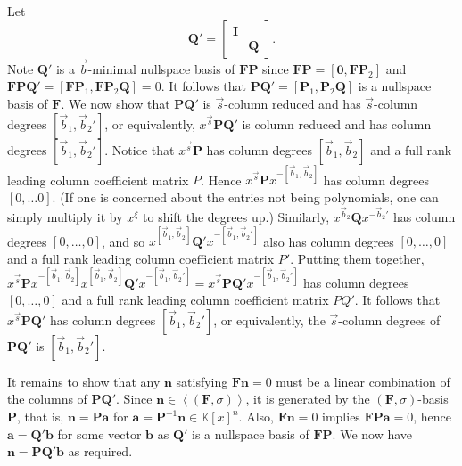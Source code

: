 \begin{pf}
Let 
\[
\mathbf{Q}'=\begin{bmatrix}\mathbf{I}\\
 & \mathbf{Q}
\end{bmatrix}.
\]
 Note $\mathbf{Q}'$ is a $\vec{b}$-minimal nullspace basis of $\mathbf{F}\mathbf{P}$
since $\mathbf{F}\mathbf{P}=\left[\mathbf{0},\mathbf{F}\mathbf{P}_{2}\right]$
and $\mathbf{F}\mathbf{P}\mathbf{Q}'=\left[\mathbf{F}\mathbf{P}_{1},\mathbf{F}\mathbf{P}_{2}\mathbf{Q}\right]=0$.
It follows that $\mathbf{P}\mathbf{Q}'=\left[\mathbf{P}_{1},\mathbf{P}_{2}\mathbf{Q}\right]$
is a nullspace basis of $\mathbf{F}$. We now show that $\mathbf{P}\mathbf{Q}'$
is $\vec{s}$-column reduced and has $\vec{s}$-column degrees $\left[\vec{b}_{1},\vec{b}_{2}'\right]$,
or equivalently, $x^{\vec{s}}\mathbf{P}\mathbf{Q}'$ is column reduced
and has column degrees $\left[\vec{b}_{1},\vec{b}_{2}'\right]$. Notice
that $x^{\vec{s}}\mathbf{P}$ has column degrees $\left[\vec{b}_{1},\vec{b}_{2}\right]$
and a full rank leading column coefficient matrix $P$. Hence $x^{\vec{s}}\mathbf{P}x^{-\left[\vec{b}_{1},\vec{b}_{2}\right]}$
has column degrees $\left[0,\dots0\right]$. (If one is concerned
about the entries not being polynomials, one can simply multiply it
by $x^{\xi}$ to shift the degrees up.) Similarly, $x^{\vec{b}_{2}}\mathbf{Q}x^{-\vec{b}_{2}'}$
has column degrees $[0,\dots,0]$, and so $x^{\left[\vec{b}_{1},\vec{b}_{2}\right]}\mathbf{Q}'x^{-\left[\vec{b}_{1},\vec{b}_{2}'\right]}$
also has column degrees $[0,\dots,0]$ and a full rank leading column
coefficient matrix $P'$. Putting them together, $x^{\vec{s}}\mathbf{P}x^{-\left[\vec{b}_{1},\vec{b}_{2}\right]}x^{\left[\vec{b}_{1},\vec{b}_{2}\right]}\mathbf{Q}'x^{-\left[\vec{b}_{1},\vec{b}_{2}'\right]}=x^{\vec{s}}\mathbf{P}\mathbf{Q}'x^{-\left[\vec{b}_{1},\vec{b}_{2}'\right]}$
has column degrees $[0,\dots,0]$ and a full rank leading column coefficient
matrix $PQ'$. It follows that $x^{\vec{s}}\mathbf{P}\mathbf{Q}'$
has column degrees $\left[\vec{b}_{1},\vec{b}_{2}'\right]$, or equivalently,
the $\vec{s}$-column degrees of $\mathbf{PQ}'$ is $\left[\vec{b}_{1},\vec{b}_{2}'\right]$.

It remains to show that any $\mathbf{n}$ satisfying $\mathbf{F}\mathbf{n}=0$
must be a linear combination of the columns of $\mathbf{PQ}'$. Since
$\mathbf{n}\in\left\langle \left(\mathbf{F},\sigma\right)\right\rangle $,
it is generated by the $\left(\mathbf{F},\sigma\right)$-basis $\mathbf{P}$,
that is, $\mathbf{n}=\mathbf{P}\mathbf{a}$ for $\mathbf{a}=\mathbf{P}^{-1}\mathbf{n}\in\mathbb{K}\left[x\right]^{n}$.
Also, $\mathbf{F}\mathbf{n}=0$ implies $\mathbf{F}\mathbf{P}\mathbf{a}=0$,
hence $\mathbf{a}=\mathbf{Q}'\mathbf{b}$ for some vector $\mathbf{b}$
as $\mathbf{Q}'$ is a nullspace basis of $\mathbf{F}\mathbf{P}$.
We now have $\mathbf{n}=\mathbf{P}\mathbf{Q}'\mathbf{b}$ as required.\end{pf}
